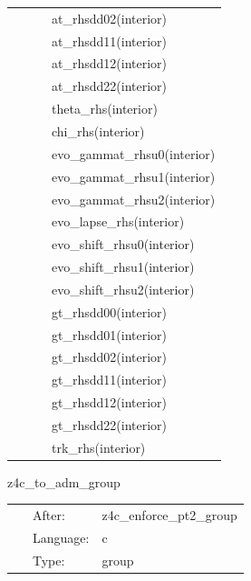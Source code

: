 \begin{tabular*}{160mm}{cll}
~& ~ &at\_rhsdd02(interior)\\ 
~& ~ &at\_rhsdd11(interior)\\ 
~& ~ &at\_rhsdd12(interior)\\ 
~& ~ &at\_rhsdd22(interior)\\ 
~& ~ &theta\_rhs(interior)\\ 
~& ~ &chi\_rhs(interior)\\ 
~& ~ &evo\_gammat\_rhsu0(interior)\\ 
~& ~ &evo\_gammat\_rhsu1(interior)\\ 
~& ~ &evo\_gammat\_rhsu2(interior)\\ 
~& ~ &evo\_lapse\_rhs(interior)\\ 
~& ~ &evo\_shift\_rhsu0(interior)\\ 
~& ~ &evo\_shift\_rhsu1(interior)\\ 
~& ~ &evo\_shift\_rhsu2(interior)\\ 
~& ~ &gt\_rhsdd00(interior)\\ 
~& ~ &gt\_rhsdd01(interior)\\ 
~& ~ &gt\_rhsdd02(interior)\\ 
~& ~ &gt\_rhsdd11(interior)\\ 
~& ~ &gt\_rhsdd12(interior)\\ 
~& ~ &gt\_rhsdd22(interior)\\ 
~& ~ &trk\_rhs(interior)\\ 
\end{tabular*} 


\vspace{5mm}


\hspace{5mm} z4c\_to\_adm\_group 

\hspace{5mm}{\it group for function `z4c\_to\_adm`. generated by einsteinengine. } 


\hspace{5mm}

 \begin{tabular*}{160mm}{cll} 
~ & After:  & z4c\_enforce\_pt2\_group \\ 
~ & Language:  & c \\ 
~ & Type:  & group \\ 
\end{tabular*} 


\vspace{5mm}


